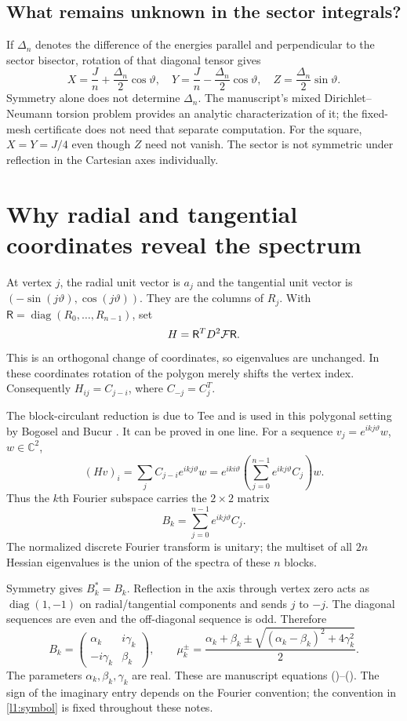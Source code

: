 \subsection{What remains unknown in the sector integrals?}
If $\Delta_n$ denotes the difference of the energies parallel and
perpendicular to the sector bisector, rotation of that diagonal tensor gives
\[
 X=\frac Jn+\frac{\Delta_n}{2}\cos\vartheta,\quad
 Y=\frac Jn-\frac{\Delta_n}{2}\cos\vartheta,\quad
 Z=\frac{\Delta_n}{2}\sin\vartheta.
\]
Symmetry alone does not determine $\Delta_n$. The manuscript's mixed
Dirichlet--Neumann torsion problem provides an analytic characterization
of it; the fixed-mesh certificate does not need that separate computation.
For the square, $X=Y=J/4$ even though $Z$ need not vanish. The sector is
not symmetric under reflection in the Cartesian axes individually.

\section{Why radial and tangential coordinates reveal the spectrum}
\label{l1:fourier}
At vertex $j$, the radial unit vector is $a_j$ and the tangential unit
vector is $(-\sin(j\vartheta),\cos(j\vartheta))$. They are the columns
of $R_j$. With $\mathsf R=\operatorname{diag}(R_0,\ldots,R_{n-1})$, set
\[
 H=\mathsf R^TD^2\mathcal F\mathsf R.
\]
This is an orthogonal change of coordinates, so eigenvalues are unchanged.
In these coordinates rotation of the polygon merely shifts the vertex
index. Consequently $H_{ij}=C_{j-i}$, where $C_{-j}=C_j^T$.

The block-circulant reduction is due to Tee \cite{Tee2007} and is used in
this polygonal setting by Bogosel and Bucur \cite{BogoselBucur2024}.
It can be proved in one line. For a sequence
$v_j=e^{ikj\vartheta}w$, $w\in\mathbb C^2$,
\[
 (Hv)_i=\sum_j C_{j-i}e^{ikj\vartheta}w
 =e^{iki\vartheta}\left(\sum_{j=0}^{n-1}e^{ikj\vartheta}C_j\right)w.
\]
Thus the $k$th Fourier subspace carries the $2\times2$ matrix
\begin{equation}
 B_k=\sum_{j=0}^{n-1}e^{ikj\vartheta}C_j.
 \label{l1:symbol}
\end{equation}
The normalized discrete Fourier transform is unitary; the multiset of all
$2n$ Hessian eigenvalues is the union of the spectra of these $n$ blocks.

Symmetry gives $B_k^*=B_k$. Reflection in the axis through vertex zero
acts as $\operatorname{diag}(1,-1)$ on radial/tangential components and
sends $j$ to $-j$. The diagonal sequences are even and the off-diagonal
sequence is odd. Therefore
\begin{equation}
 B_k=\begin{pmatrix}\alpha_k&i\gamma_k\\-i\gamma_k&\beta_k\end{pmatrix},
 \qquad
 \mu_k^\pm=\frac{\alpha_k+\beta_k
 \pm\sqrt{(\alpha_k-\beta_k)^2+4\gamma_k^2}}2.
 \label{l1:eigenvalues}
\end{equation}
The parameters $\alpha_k,\beta_k,\gamma_k$ are real. These are manuscript
equations ()--(). The sign of the imaginary
entry depends on the Fourier convention; the convention in
\eqref{l1:symbol} is fixed throughout these notes.

